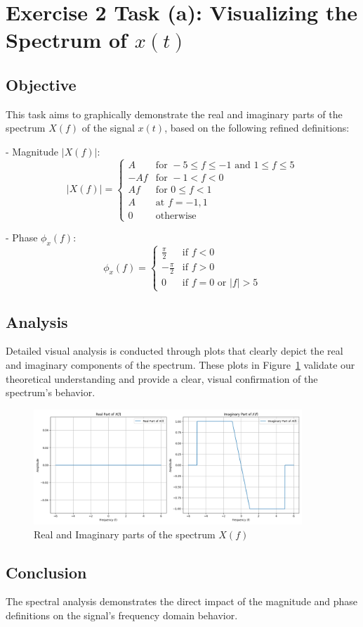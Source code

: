 \item[(a)]
\section*{Exercise 2 Task (a): Visualizing the Spectrum of \(x(t)\)}

\subsection*{Objective}
This task aims to graphically demonstrate the real and imaginary parts of the spectrum \(X(f)\) of the signal \(x(t)\), based on the following refined definitions:

- Magnitude \(|X(f)|\):
  \[
  |X(f)| =
  \begin{cases}
  A & \text{for } -5 \leq f \leq -1 \text{ and } 1 \leq f \leq 5 \\
  -Af & \text{for } -1 < f < 0 \\
  Af & \text{for } 0 \leq f < 1 \\
  A & \text{at } f = -1, 1 \\
  0 & \text{otherwise}
  \end{cases}
  \]

- Phase \(\phi_x(f)\):
  \[
  \phi_x(f) =
  \begin{cases}
  \frac{\pi}{2} & \text{if } f < 0 \\
  -\frac{\pi}{2} & \text{if } f > 0 \\
  0 & \text{if } f = 0 \text{ or } |f| > 5
  \end{cases}
  \]

\subsection*{Analysis}
Detailed visual analysis is conducted through plots that clearly depict the real and imaginary components of the spectrum.
These plots in Figure~\ref{fig:spectrum_analysis_a} validate our theoretical understanding and provide a clear, visual confirmation of the spectrum's behavior.

\begin{figure}[h]
    \centering
    \includegraphics[width=0.9\textwidth]{fig/ex2_task_a_spectrum_analysis}
    \caption{Real and Imaginary parts of the spectrum \(X(f)\)}
    \label{fig:spectrum_analysis_a}
\end{figure}

\subsection*{Conclusion}
The spectral analysis demonstrates the direct impact of the magnitude and phase definitions on the signal's frequency domain behavior.